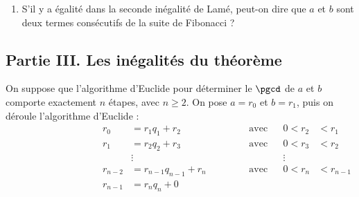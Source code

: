 \documentclass[a4paper,french,bookmarks]{article}
\begin{document}
\begin{enumerate}[resume]
    \item  S’il y a égalité dans la seconde inégalité de Lamé, peut-on dire que $a$ et $b$ sont deux termes consécutifs de la suite de Fibonacci ?

\end{enumerate}

\subsection*{Partie III. Les inégalités du théorème}

On suppose que l’algorithme d’Euclide pour déterminer le $\pgcd$ de $a$ et $b$ comporte exactement $n$ étapes, avec $n \geq 2$.
On pose $a = r_0$ et $b = r_1$, puis on déroule l'algorithme d'Euclide :
\begin{align*}
    \qquad\qquad\qquad\qquad&& r_0 &= r_1q_1 + r_2 &&\qquad&\text{avec} && 0 < r_2 &< r_1 &&\qquad\qquad\qquad\qquad\\
    && r_1 &= r_2q_2 + r_3&& &\text{avec} &&  0 < r_3 &< r_2&&\\
    &&  &\vdots &&  &&   &\vdots&&\\
    &&r_{n-2} &= r_{n-1}q_{n-1} + r_n && &\text{avec} && 0 < r_n &< r_{n-1}\\
    &&r_{n-1} &= r_nq_n + \boxed{0}
\end{align*}
\end{document}
